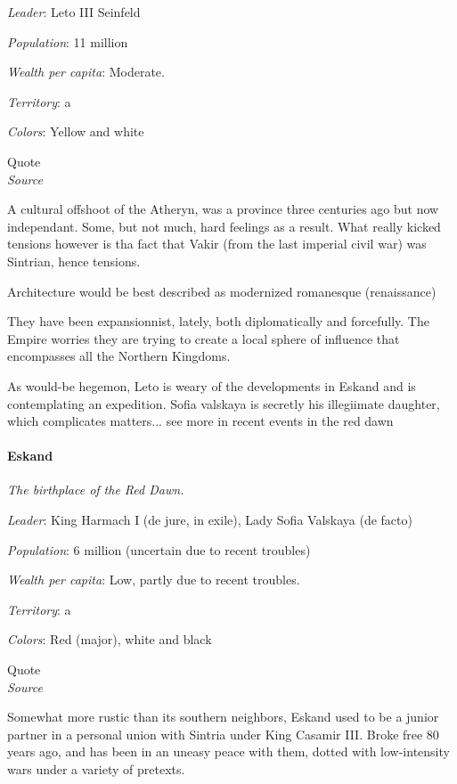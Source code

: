 \textit{Leader}: Leto III Seinfeld

\textit{Population}: 11 million

\textit{Wealth per capita}: Moderate.

\textit{Territory}: a
    
\textit{Colors}: Yellow and white


\begin{rpg-quotebox}
    Quote \\ \textendash \textit{Source}
    \end{rpg-quotebox}


A cultural offshoot of the Atheryn, was a province three centuries ago but now independant. Some, but not much, hard feelings as a result. What really kicked tensions however is tha fact that Vakir (from the last imperial civil war) was Sintrian, hence tensions.

Architecture would be best described as modernized romanesque (renaissance)

They have been expansionnist, lately, both diplomatically and forcefully. The Empire worries they are trying to create a local sphere of influence that encompasses all the Northern Kingdoms.

As would-be hegemon, Leto is weary of the developments in Eskand and is contemplating an expedition.
Sofia valskaya is secretly his illegiimate daughter, which complicates matters... see more in recent events in the red dawn


\paragraph{Eskand}


\textit{The birthplace of the Red Dawn.}


\textit{Leader}: King Harmach I (de jure, in exile), Lady Sofia Valskaya (de facto)

\textit{Population}: 6 million (uncertain due to recent troubles)

\textit{Wealth per capita}: Low, partly due to recent troubles.

\textit{Territory}: a
    
\textit{Colors}: Red (major), white and black


\begin{rpg-quotebox}
Quote \\ \textendash \textit{Source}
\end{rpg-quotebox}


Somewhat more rustic than its southern neighbors, Eskand used to be a junior partner in a personal union with Sintria under King Casamir III. Broke free 80 years ago, and has been in an uneasy peace with them, dotted with low-intensity wars under a variety of pretexts.
    
